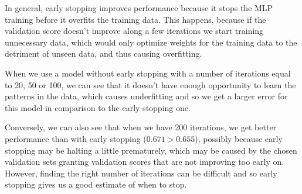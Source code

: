 \documentclass[12pt]{article}
\begin{document}
\begin{enumerate}[leftmargin=\labelsep]
        In general, early stopping improves performance because it stops the MLP training before it overfits the training data. This happens, because if the validation
        score doesn't improve along a few iterations we start training unnecessary data, which would only optimize weights for the training data to the detriment of
        unseen data, and thus causing overfitting.

        When we use a model without early stopping with a number of iterations equal to 20, 50 or 100, we can see that it doesn't have enough opportunity to learn the
        patterns in the data, which causes underfitting and so we get a larger error for this model in comparison to the early stopping one.

        Conversely, we can also see that when we have 200 iterations, we get better performance than with early stopping ($0.671 > 0.655$), possibly because early
        stopping may be halting a little prematurely, which may be caused by the chosen validation sets granting validation scores that are not improving too early on.
        However, finding the right number of iterations can be difficult and so early stopping gives us a good estimate of when to stop.
\end{enumerate}
\end{document}
